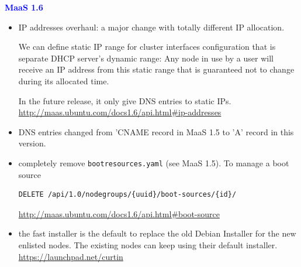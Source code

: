 \textcolor{blue}{\bf MaaS 1.6} 
\begin{itemize}
  \item IP addresses overhaul: a major change with totally different IP
  allocation.
  
  We can define static IP range for cluster interfaces configuration that is
  separate DHCP server's dynamic range: Any node in use by a user will receive
  an IP address from this static range that is guaranteed not to change during
  its allocated time.
  
  In the future release, it only give DNS entries to static IPs.
  \url{http://maas.ubuntu.com/docs1.6/api.html\#ip-addresses}
  
  \item DNS entries changed from 'CNAME record in MaaS 1.5 to 'A' record in this
  version.
  
  \item completely remove \verb!bootresources.yaml! (see MaaS 1.5). To manage a
  boot source
  \begin{verbatim}
DELETE /api/1.0/nodegroups/{uuid}/boot-sources/{id}/
  \end{verbatim}
  \url{http://maas.ubuntu.com/docs1.6/api.html\#boot-source}
  
  \item the fast installer is the default to replace the old Debian Installer
  for the new enlisted nodes. The existing nodes can keep using their default
  installer.
  \url{https://launchpad.net/curtin}
  
\end{itemize}

